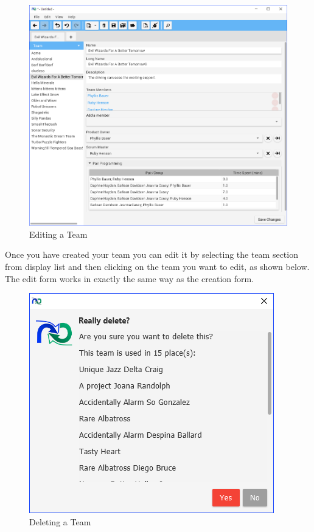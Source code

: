 \begin{figure}[H]
	\centering
	\includegraphics[width=\textwidth]{images/screenshots/teams4.PNG}
	\caption{Editing a Team}
	\label{fig:new_project}
\end{figure}

Once you have created your team you can edit it by selecting the team section from display list and then clicking on the team you want to edit, as shown below. The edit form works in exactly the same way as the creation form.

\begin{figure}[H]
	\centering
	\includegraphics[width=\textwidth]{images/screenshots/teams5.PNG}
	\caption{Deleting a Team}
	\label{fig:new_project}
\end{figure}


